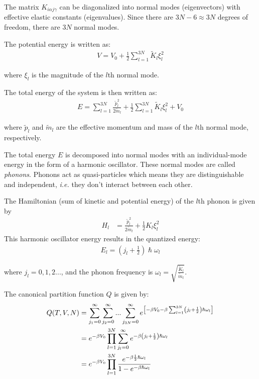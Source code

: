 \documentclass[book.tex]{subfiles}
\begin{document}
The matrix $K_{i\alpha j \gamma}$ can be diagonalized into normal modes (eigenvectors) with effective elastic constants (eigenvalues). Since there are $3N-6\approx 3N$ degrees of freedom, there are $3N$ normal modes.

The potential energy is written as:
\begin{align}\label{Eq18}
V = V_0 + \frac{1}{2}\sum_{l=1}^{3N} \tilde{K}_l \xi_l^2
\end{align}

\noindent where $\xi_l$ is the magnitude of the $l$th normal mode.

The total energy of the system is then written as:
\begin{align}\label{Eq19}
E = \sum_{l=1}^{3N}\frac{\tilde{p}_l^2}{2\tilde{m}_l} + \frac{1}{2}\sum_{l=1}^{3N}\tilde{K}_l \xi_l^2 + V_0
\end{align}

\noindent where $\tilde{p}_l$ and $\tilde{m}_l$ are the effective momentum and mass of the $l$th normal mode, respectively.

The total energy $E$ is decomposed into normal modes with an individual-mode energy in the form of a harmonic oscillator. These normal modes are called \textit{phonons}. Phonons act as quasi-particles which means they are distinguishable and independent, \textit{i.e.} they don't interact between each other.

The Hamiltonian (sum of kinetic and potential energy) of the $l$th
phonon is given by 
\begin{align}
H_l &= \frac{\tilde{p}_l^2}{2\tilde{m}_l} + \frac{1}{2}K_l\xi^2_l
\end{align}
This harmonic oscillator energy results in the quantized energy:
\begin{align}\label{Eq20}
E_l = \left(j_l + \frac{1}{2}\right)\hslash\omega_l
\end{align}

\noindent where $j_l = 0,1,2...$, and the phonon frequency is $\omega_l = \sqrt{\frac{\tilde{K}_l}{\tilde{m}_l}}$.

The canonical partition function $Q$ is given by:
\begin{align}\label{Eq21}
Q(T,V,N) &= \sum_{j_1 = 0}^\infty \sum_{j_2 = 0}^\infty ... \sum_{j_{3N} = 0}^\infty e^{\left[ -\beta V_0 - \beta \sum_{l=1}^{3N} \left(j_l + \frac{1}{2}\right)\hslash\omega_l \right]} \notag\\
&= e^{ -\beta V_0 } \prod_{l=1}^{3N} \sum_{j_l = 0}^\infty e^{-\beta\left(j_l + \frac{1}{2}\right)\hslash\omega_l} \notag\\
&=e^{ -\beta V_0 } \prod_{l=1}^{3N} \frac{e^{-\beta\frac{1}{2}\hslash\omega_l}}{1 - e^{-\beta\hslash\omega_l}}
\end{align}
\end{document}
